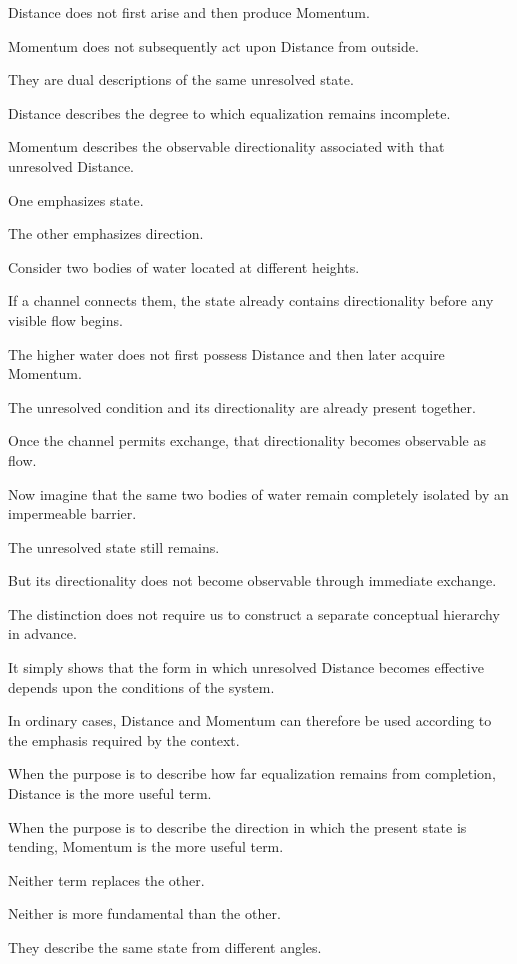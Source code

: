 Distance does not first arise and then produce Momentum.

Momentum does not subsequently act upon Distance from outside.

They are dual descriptions of the same unresolved state.

Distance describes the degree to which equalization remains incomplete.

Momentum describes the observable directionality associated with that unresolved Distance.

One emphasizes state.

The other emphasizes direction.

Consider two bodies of water located at different heights.

If a channel connects them, the state already contains directionality before any visible flow begins.

The higher water does not first possess Distance and then later acquire Momentum.

The unresolved condition and its directionality are already present together.

Once the channel permits exchange, that directionality becomes observable as flow.

Now imagine that the same two bodies of water remain completely isolated by an impermeable barrier.

The unresolved state still remains.

But its directionality does not become observable through immediate exchange.

The distinction does not require us to construct a separate conceptual hierarchy in advance.

It simply shows that the form in which unresolved Distance becomes effective depends upon the conditions of the system.

In ordinary cases, Distance and Momentum can therefore be used according to the emphasis required by the context.

When the purpose is to describe how far equalization remains from completion, Distance is the more useful term.

When the purpose is to describe the direction in which the present state is tending, Momentum is the more useful term.

Neither term replaces the other.

Neither is more fundamental than the other.

They describe the same state from different angles.


